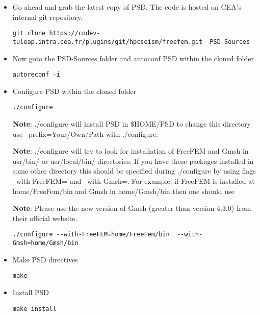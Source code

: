 \begin{itemize}
\item  Go ahead and grab the latest copy of PSD. The code is hosted on CEA's internal git repository.

\begin{lstlisting}[style=Linux]
git clone https://codev-tuleap.intra.cea.fr/plugins/git/hpcseism/freefem.git  PSD-Sources
\end{lstlisting}

\item  Now goto the {\ttfamily PSD-Sources} folder and autoconf PSD within the  cloned folder

\begin{lstlisting}[style=Linux]
autoreconf -i
\end{lstlisting}

\item Configure  PSD within the  cloned folder
\begin{lstlisting}[style=Linux]
./configure
\end{lstlisting}
\textbf{Note}:   {\ttfamily ./configure will} install PSD in {\ttfamily  \$HOME/PSD } to change this directory use {\ttfamily  --prefix=Your/Own/Path } with {\ttfamily ./configure}. 

\textbf{Note}:   {\ttfamily ./configure} will try to look for installation of {\ttfamily FreeFEM} and {\ttfamily Gmsh} in {\ttfamily usr/bin/} or {\ttfamily usr/local/bin/} directories. If you have these packages installed in some other directory this should be specified during {\ttfamily ./configure} by using flags {\ttfamily --with-FreeFEM=} and {\ttfamily --with-Gmsh=}. For example, if {\ttfamily FreeFEM} is installed at {\ttfamily home/FreeFem/bin} and {\ttfamily Gmsh} in {\ttfamily home/Gmsh/bin} then one should use

\textbf{Note}: Please use the new version of {\ttfamily Gmsh} (greater than version 4.3.0) from their official website.

\begin{lstlisting}[style=Linux]
./configure --with-FreeFEM=home/FreeFem/bin  --with-Gmsh=home/Gmsh/bin
\end{lstlisting}

\item Make PSD directives
\begin{lstlisting}[style=Linux]
make 
\end{lstlisting}


\item Install PSD
\begin{lstlisting}[style=Linux]
make install
\end{lstlisting}


\end{itemize}
